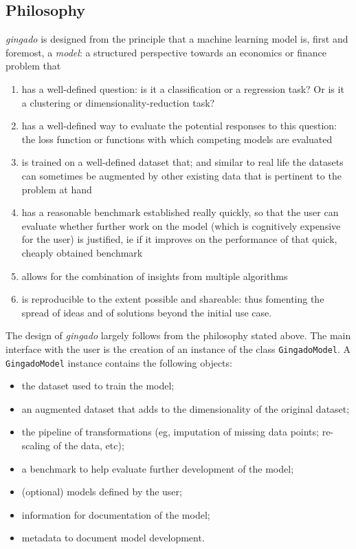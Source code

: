 \documentclass{article}
\begin{document}
\subsection{Philosophy}

\textit{gingado} is designed from the principle that a machine learning model is, first and foremost, a \textit{model}: a structured perspective towards an economics or finance problem that 
\begin{enumerate}
    \item has a well-defined question: is it a classification or a regression task? Or is it a clustering or dimensionality-reduction task?
    \item has a well-defined way to evaluate the potential responses to this question: the loss function or functions with which competing models are evaluated
    \item is trained on a well-defined dataset that; and similar to real life the datasets can sometimes be augmented by other existing data that is pertinent to the problem at hand
    \item has a reasonable benchmark established really quickly, so that the user can evaluate whether further work on the model (which is cognitively expensive for the user) is justified, ie if it improves on the performance of that quick, cheaply obtained benchmark
    \item allows for the combination of insights from multiple algorithms
    \item is reproducible to the extent possible and shareable: thus fomenting the spread of ideas and of solutions beyond the initial use case.
\end{enumerate}

The design of \textit{gingado} largely follows from the philosophy stated above. The main interface with the user is the creation of an instance of the class \texttt{GingadoModel}. A \texttt{GingadoModel} instance contains the following objects:

\begin{itemize}
    \item the dataset used to train the model;
    \item an augmented dataset that adds to the dimensionality of the original dataset;
    \item the pipeline of transformations (eg, imputation of missing data points; re-scaling of the data, etc);
    \item a benchmark to help evaluate further development of the model;
    \item (optional) models defined by the user;
    \item information for documentation of the model;
    \item metadata to document model development.
\end{itemize}
\end{document}
